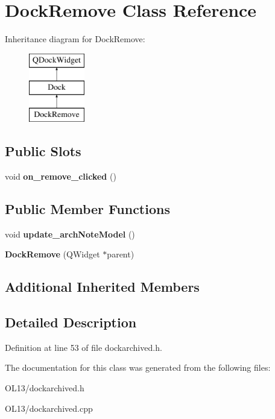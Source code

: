 \hypertarget{class_dock_remove}{}\section{Dock\+Remove Class Reference}
\label{class_dock_remove}
Inheritance diagram for Dock\+Remove\+:\begin{figure}[H]
\begin{center}
\leavevmode
\includegraphics[height=3.000000cm]{class_dock_remove}
\end{center}
\end{figure}
\subsection*{Public Slots}
\begin{DoxyCompactItemize}
\item 
\mbox{\label{class_dock_remove_af674d9505592df25cd5b08328c0cdbd6}} 
void {\bfseries on\+\_\+remove\+\_\+clicked} ()
\end{DoxyCompactItemize}
\subsection*{Public Member Functions}
\begin{DoxyCompactItemize}
\item 
\mbox{\label{class_dock_remove_a4e653c9a21161b7d76c9cfd330579047}} 
void {\bfseries update\+\_\+arch\+Note\+Model} ()
\item 
\mbox{\label{class_dock_remove_aa2665bd1459600d9346029df9f2bba27}} 
{\bfseries Dock\+Remove} (Q\+Widget $\ast$parent)
\end{DoxyCompactItemize}
\subsection*{Additional Inherited Members}


\subsection{Detailed Description}


Definition at line 53 of file dockarchived.\+h.



The documentation for this class was generated from the following files\+:\begin{DoxyCompactItemize}
\item 
O\+L13/dockarchived.\+h\item 
O\+L13/dockarchived.\+cpp\end{DoxyCompactItemize}
